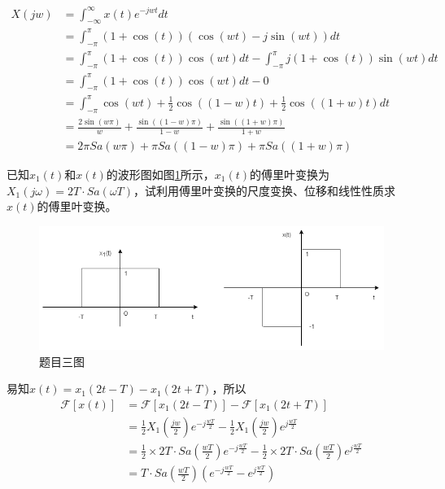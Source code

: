 \documentclass[answers]{exam}  %
\begin{document}
\begin{questions}
\begin{solution}
    \begin{align*}
    	X(jw)&=\int_{-\infty}^{\infty} x(t)e^{-jwt} dt\\ 
    	     &=\int_{-\pi}^{\pi} (1+\cos(t))(\cos(wt)-j\sin(wt)) dt\\
    	     &=\int_{-\pi}^{\pi} (1+\cos(t))\cos(wt)dt- \int_{-\pi}^{\pi} j(1+\cos(t))\sin(wt) dt\\
    	     &=\int_{-\pi}^{\pi} (1+\cos(t))\cos(wt)dt-0\\
    	     &=\int_{-\pi}^{\pi} \cos(wt)+\frac{1}{2}\cos((1-w)t)+\frac{1}{2}\cos((1+w)t)dt\\
    	     &=\frac{2\sin(w\pi)}{w}+\frac{\sin((1-w)\pi)}{1-w}+\frac{\sin((1+w)\pi)}{1+w}\\
    	     &=2\pi Sa(w\pi)+\pi Sa((1-w)\pi)+\pi Sa((1+w)\pi)
    \end{align*}
\end{solution}


\question 已知$x_1(t)$和$x(t)$的波形图如图\ref{fig:3}所示，$x_1(t)$的傅里叶变换为$X_1(j\omega)=2T \cdot Sa(\omega T)$，试利用傅里叶变换的尺度变换、位移和线性性质求$x(t)$的傅里叶变换。

\begin{figure}
	\centering
	\includegraphics[width=\linewidth]{pics/dsp2-3.png}
	\caption{题目三图}
	\label{fig:3}
\end{figure}

\begin{solution}
	易知$x(t)=x_1(2t-T)-x_1(2t+T)$，所以
	\begin{align*}
		\mathcal{F}[x(t)]&=\mathcal{F}[x_1(2t-T)]-\mathcal{F}[x_1(2t+T)]\\
		&=\frac{1}{2}X_1(\frac{jw}{2})e^{-j\frac{wT}{2}}-\frac{1}{2}X_1(\frac{jw}{2})e^{j\frac{wT}{2}}\\
		&=\frac{1}{2}\times 2T\cdot Sa(\frac{wT}{2})e^{-j\frac{wT}{2}}-\frac{1}{2}\times 2T\cdot Sa(\frac{wT}{2})e^{j\frac{wT}{2}}\\
		&=T\cdot Sa(\frac{wT}{2})(e^{-j\frac{wT}{2}}-e^{j\frac{wT}{2}})
	\end{align*}
\end{solution}



\end{questions}
\end{document}
